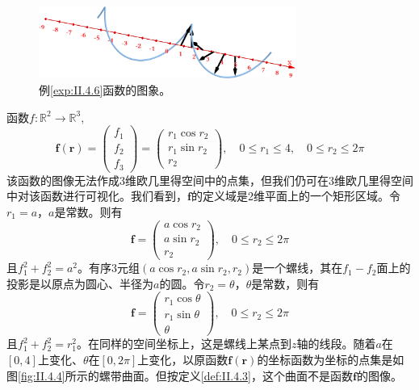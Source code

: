 \documentclass[main.tex]{subfiles}
\begin{document}
\begin{figure}[h]
    \centering
    \includegraphics[width=0.75\textwidth]{images/II.4.3.png}
    \caption{例\ref{exp:II.4.6}函数的图象。}
    \label{fig:II.4.3}
\end{figure}
\begin{example}\label{exp:II.4.7}
    函数$f:\mathbb{R}^2\rightarrow\mathbb{R}^3,$
    \[
        \mathbf{f}\left(\mathbf{r}\right)=\left(\begin{array}{c}f_1\\f_2\\f_3\end{array}\right)=\left(\begin{array}{c}r_1\cos r_2\\r_1\sin r_2\\r_2\end{array}\right),\quad 0\leq r_1\leq 4,\quad 0\leq r_2\leq 2\pi
    \]
    该函数的图像无法作成3维欧几里得空间中的点集，但我们仍可在3维欧几里得空间中对该函数进行可视化。我们看到，$\mathbf{f}$的定义域是2维平面上的一个矩形区域。令$r_1=a$，$a$是常数。则有
    \[
        \mathbf{f}=\left(\begin{array}{c}
                a\cos r_2 \\
                a\sin r_2 \\
                r_2
            \end{array}\right),\quad 0\leq r_2\leq 2\pi
    \]
    且$f_1^2+f_2^2=a^2$。有序3元组$\left(a\cos r_2,a\sin r_2,r_2\right)$是一个螺线，其在$f_1-f_2$面上的投影是以原点为圆心、半径为$a$的圆。令$r_2=\theta$，$\theta$是常数，则有
    \[
        \mathbf{f}=\left(\begin{array}{c}
                r_1\cos \theta \\
                r_1\sin \theta \\
                \theta
            \end{array}\right),\quad 0\leq r_2\leq 2\pi
    \]
    且$f_1^2+f_2^2=r_1^2$。在同样的空间坐标上，这是螺线上某点到$z$轴的线段。随着$a$在$\left[0,4\right]$上变化、$\theta$在$\left[0,2\pi\right]$上变化，以原函数$\mathbf{f}\left(\mathbf{r}\right)$的坐标函数为坐标的点集是如图\ref{fig:II.4.4}所示的螺带曲面。但按定义\ref{def:II.4.3}，这个曲面不是函数$\mathbf{f}$的图像。
\end{example}
\end{document}
